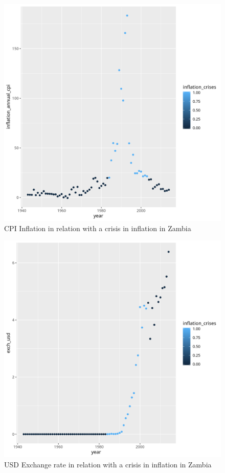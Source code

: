\documentclass{article}
\begin{document}
    \begin{figure}[h!]
        \caption{ CPI Inflation in relation with a crisis in inflation in Zambia}
        \includegraphics[scale=0.7]{plot3_zambia.png}
    \end{figure}

    \begin{figure}[h!]
        \caption{ USD Exchange rate in relation with a crisis in inflation in Zambia}
        \includegraphics[scale=0.7]{plot3_exch_usd_zambia.png}
    \end{figure}
    \newpage
\end{document}
